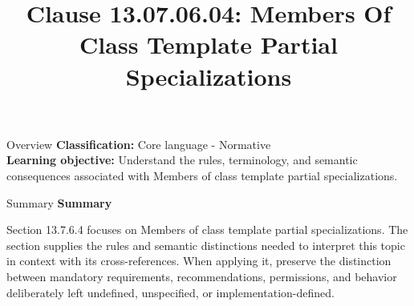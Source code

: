 \documentclass[10pt,letterpaper]{article}
\title{Clause 13.07.06.04: Members Of Class Template Partial Specializations}
\author{}
\date{}
\begin{document}
\maketitle
\begin{CornellOverviewBox}{Overview}
\textbf{Classification:} Core language - Normative\\[2pt]
\textbf{Learning objective:} Understand the rules, terminology, and semantic consequences associated with Members of class template partial specializations.
\end{CornellOverviewBox}\begin{CornellSummaryBox}{Summary}
{\sffamily\bfseries\color{Accent} Summary}\par\vspace{3pt}Section 13.7.6.4 focuses on Members of class template partial specializations. The section supplies the rules and semantic distinctions needed to interpret this topic in context with its cross-references. When applying it, preserve the distinction between mandatory requirements, recommendations, permissions, and behavior deliberately left undefined, unspecified, or implementation-defined.
\end{CornellSummaryBox}
\end{document}
